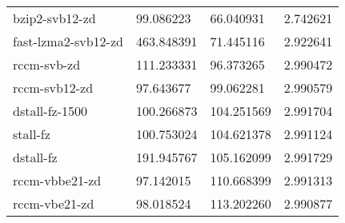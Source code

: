 \begin{table}
\begin{tabular}{|l|l|l|l|}
      bzip2-svb12-zd    &  99.086223     &   66.040931  & 2.742621\\
 fast-lzma2-svb12-zd    & 463.848391     &   71.445116  & 2.922641\\
         rccm-svb-zd    & 111.233331     &   96.373265  & 2.990472\\
       rccm-svb12-zd    &  97.643677     &   99.062281  & 2.990579\\
      dstall-fz-1500    & 100.266873     &  104.251569  & 2.991704\\
            stall-fz    & 100.753024     &  104.621378  & 2.991124\\
           dstall-fz    & 191.945767     &  105.162099  & 2.991729\\
      rccm-vbbe21-zd    &  97.142015     &  110.668399  & 2.991313\\
       rccm-vbe21-zd    &  98.018524     &  113.202260  & 2.990877\\
	\hline
    \end{tabular}
\end{table}
